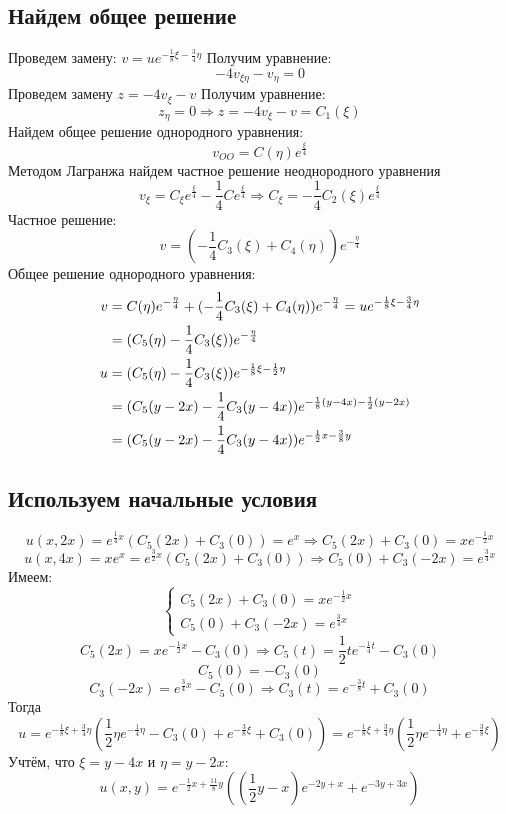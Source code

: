 \documentclass[a4paper,12pt]{article}
\begin{document}
    \subsection{Найдем общее решение}
        Проведем замену: $v = ue^{-\frac{1}{8}\xi - \frac{3}{4}\eta}$
        \newline Получим уравнение:
        $$-4v_{\xi\eta}-v_\eta = 0$$
        Проведем замену $z = -4v_\xi - v$
        \newline
        Получим уравнение:
        $$z_\eta = 0 \Rightarrow z = -4v_\xi - v = C_1(\xi)$$
        Найдем общее решение однородного уравнения:
        $$v_{OO} = C(\eta)e^{\frac{\xi}{4}}$$
        Методом Лагранжа найдем частное решение неоднородного уравнения
        $$v_\xi = C_\xi e^{\frac{\xi}{4}} - \frac{1}{4}Ce^{\frac{\xi}{4}} \Rightarrow C_\xi = -\frac{1}{4}C_2(\xi)e^{\frac{\xi}{4}}$$
        Частное решение:
        $$v = (-\frac{1}{4}C_3(\xi) + C_4(\eta)) e^{-\frac{\eta}{4}}$$
        Общее решение однородного уравнения:
        \begin{align}
            v &= C(\eta)e^{-\frac{\eta}{4}} + (-\frac{1}{4}C_3(\xi) + C_4(\eta)) e^{-\frac{\eta}{4}} 
            = ue^{-\frac{1}{8}\xi - \frac{3}{4}\eta} \notag \\ 
            &= (C_5(\eta) - \frac{1}{4}C_3(\xi))e^{-\frac{\eta}{4}}  \notag \\
            u &= (C_5(\eta) - \frac{1}{4}C_3(\xi))e^{-\frac{1}{8}\xi-\frac{1}{2}\eta} \notag \\
            &= (C_5(y-2x) - \frac{1}{4}C_3(y-4x))e^{-\frac{1}{8}(y-4x)-\frac{1}{2}(y-2x)} \notag \\
            &= (C_5(y-2x) - \frac{1}{4}C_3(y-4x))e^{-\frac{1}{2}x-\frac{3}{8}y} \notag
        \end{align}
    \subsection{Используем начальные условия}
        $$u(x, 2x) = e^{\frac{1}{4}x}(C_5(2x) + C_3(0)) = e^x \Rightarrow C_5(2x) + C_3(0) = xe^{-\frac{1}{2}x}$$
        $$u(x, 4x) = xe^x = e^{\frac{3}{2}x}(C_5(2x) + C_3(0)) \Rightarrow C_5(0) + C_3(-2x) = e^{\frac{3}{4}x}$$
        Имеем:
        \begin{equation*}
            \begin{cases}
                C_5(2x) + C_3(0) = xe^{-\frac{1}{2}x} \\
                C_5(0) + C_3(-2x) = e^{\frac{3}{4}x}
            \end{cases}
        \end{equation*}
        $$C_5(2x) = xe^{-\frac{1}{2}x} - C_3(0) \Rightarrow C_5(t) = \frac{1}{2}te^{-\frac{1}{4}t} - C_3(0)$$
        $$C_5(0) = -C_3(0)$$
        $$C_3(-2x) = e^{\frac{3}{4}x} - C_5(0) \Rightarrow C_3(t) = e^{-\frac{3}{8}t} + C_3(0)$$
        Тогда 
        $$u = e^{-\frac{1}{8}\xi + \frac{3}{4}\eta}(\frac{1}{2}\eta e^{-\frac{1}{4}\eta} - C_3(0) + e^{-\frac{3}{8}\xi} + C_3(0)) = e^{-\frac{1}{8}\xi + \frac{3}{4}\eta}(\frac{1}{2}\eta e^{-\frac{1}{4}\eta} + e^{-\frac{3}{8}\xi})$$
        Учтём, что $\xi = y-4x$ и $\eta = y - 2x$:
        $$u(x,y) = e^{-\frac{1}{2}x + \frac{11}{8}y}((\frac{1}{2}y - x)e^{-2y+x} + e^{-3y+3x})$$
\end{document}
